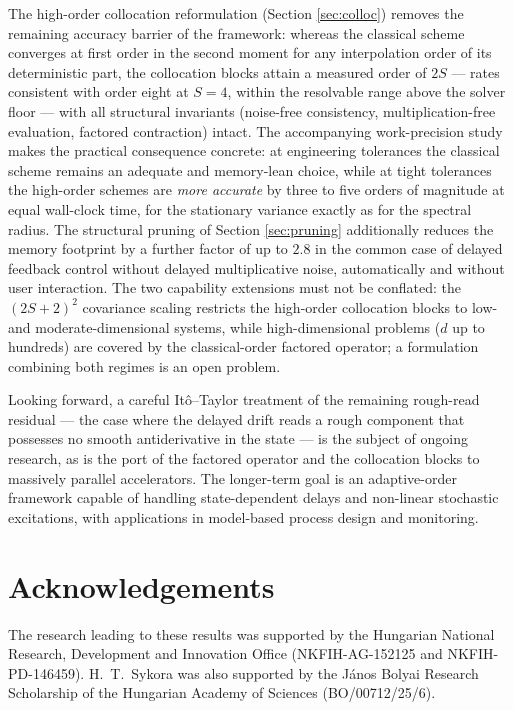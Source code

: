 \documentclass[preprint,12pt]{elsarticle}
\begin{document}
The high-order collocation reformulation (Section \ref{sec:colloc}) removes the remaining accuracy barrier of the framework: whereas the classical scheme converges at first order in the second moment for any interpolation order of its deterministic part, the collocation blocks attain a measured order of $2S$ --- rates consistent with order eight at $S=4$, within the resolvable range above the solver floor --- with all structural invariants (noise-free consistency, multiplication-free evaluation, factored contraction) intact. The accompanying work-precision study makes the practical consequence concrete: at engineering tolerances the classical scheme remains an adequate and memory-lean choice, while at tight tolerances the high-order schemes are \emph{more accurate} by three to five orders of magnitude at equal wall-clock time, for the stationary variance exactly as for the spectral radius. The structural pruning of Section \ref{sec:pruning} additionally reduces the memory footprint by a further factor of up to $2.8$ in the common case of delayed feedback control without delayed multiplicative noise, automatically and without user interaction. The two capability extensions must not be conflated: the $(2S+2)^2$ covariance scaling restricts the high-order collocation blocks to low- and moderate-dimensional systems, while high-dimensional problems ($d$ up to hundreds) are covered by the classical-order factored operator; a formulation combining both regimes is an open problem.

Looking forward, a careful It\^o--Taylor treatment of the remaining rough-read residual --- the case where the delayed drift reads a rough component that possesses no smooth antiderivative in the state --- is the subject of ongoing research, as is the port of the factored operator and the collocation blocks to massively parallel accelerators. The longer-term goal is an adaptive-order framework capable of handling state-dependent delays and non-linear stochastic excitations, with applications in model-based process design and monitoring.

\section*{Acknowledgements}
The research leading to these results was supported by the Hungarian National Research, Development and Innovation Office (NKFIH-AG-152125 and NKFIH-PD-146459). H.~T.~Sykora was also supported by the J\'anos Bolyai Research Scholarship of the Hungarian Academy of Sciences (BO/00712/25/6).
\end{document}
